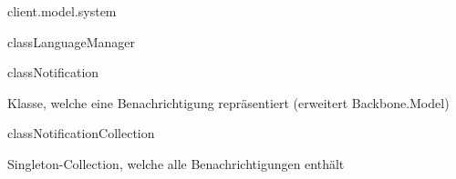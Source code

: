 \begin{texdocpackage}{client.model.system}
\begin{texdocclass}{class}{LanguageManager}
\begin{texdocclassmethods}
{\begin{texdocparameters}
\end{texdocparameters}
}
\end{texdocclassmethods}
\end{texdocclass}


\begin{texdocclass}{class}{Notification}
\label{texdoclet:edu.kit.informatik.studyplan.client.model.system.Notification}
\begin{texdocclassintro}
Klasse, welche eine Benachrichtigung repräsentiert (erweitert Backbone.Model)\end{texdocclassintro}
\begin{texdocclassfields}
\end{texdocclassfields}
\begin{texdocclassconstructors}
\end{texdocclassconstructors}
\end{texdocclass}


\begin{texdocclass}{class}{NotificationCollection}
\label{texdoclet:edu.kit.informatik.studyplan.client.model.system.NotificationCollection}
\begin{texdocclassintro}
Singleton-Collection, welche alle Benachrichtigungen enthält \texdocbr{}


\end{texdocclassintro}
\end{texdocclass}
\end{texdocpackage}
